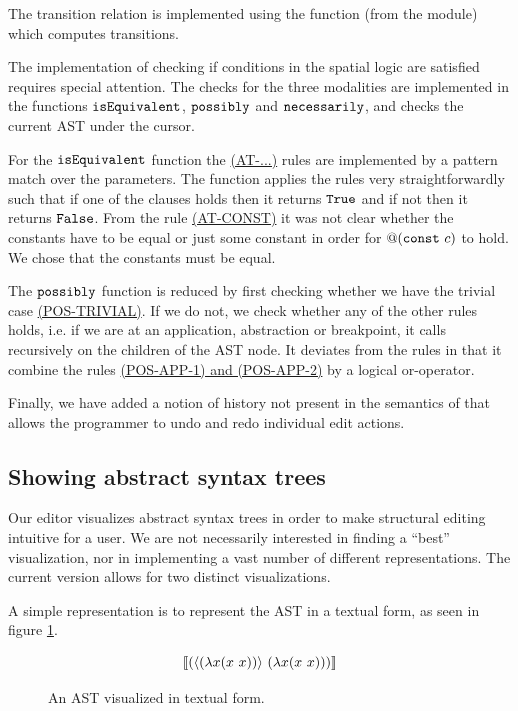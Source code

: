 The transition relation is implemented using the  function (from the
 module) which computes transitions.

The implementation of checking if conditions in the spatial logic are
satisfied requires special attention. The checks for the three
modalities are implemented in the functions $\texttt{isEquivalent}$,
$\texttt{possibly}$ and $\texttt{necessarily}$, and checks the current AST
under the cursor.

For the $\texttt{isEquivalent}$ function the
\hyperref[fig:conditionreductionrules]{(AT-...)} rules are implemented by a
pattern match over the parameters. The function applies the rules very
straightforwardly such that if one of the clauses holds then it returns
$\texttt{True}$ and if not then it returns $\texttt{False}$. From the rule
\hyperref[fig:conditionreductionrules]{(AT-CONST)} it was not clear whether the
constants have to be equal or just some constant in order for $@(\texttt{const}~c)$
to hold. We chose that the constants must be equal.

The $\texttt{possibly}$ function is reduced by first checking whether we have the
trivial case \hyperref[fig:conditionreductionrules]{(POS-TRIVIAL)}. If we do
not, we check whether any of the other rules holds, i.e. if we are at an
application, abstraction or breakpoint, it calls recursively on the children of
the AST node. It deviates from the rules in that it combine the rules
\hyperref[fig:conditionreductionrules]{(POS-APP-1) and (POS-APP-2)} by a logical
or-operator.

Finally, we have added a notion of history not present in the
semantics of \cite{10.1145/3441296.3441393} that allows the programmer
to undo and redo individual edit actions. 

\subsection{Showing abstract syntax trees}

Our editor visualizes abstract syntax trees in order to make
structural editing intuitive for a user.  We are not necessarily
interested in finding a ``best'' visualization, nor in implementing a
vast number of different representations. The current version allows
for two distinct visualizations.

A simple representation is to represent the AST in a textual form,
as seen in figure \ref{fig:ast-in-text-form}.

\begin{figure}[H]
  \Large
  \begin{equation*}
    \llbracket (\langle (\lambda{x}{(x~x)}) \rangle~(\lambda{x}{(x~x)})) \rrbracket
  \end{equation*}
  \caption{An AST visualized in textual form.}
  \label{fig:ast-in-text-form}
\end{figure}

